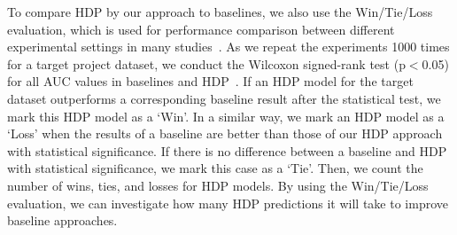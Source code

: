 To compare HDP by our approach to baselines, we also use the
Win/Tie/Loss evaluation, which is used for performance comparison between
different experimental settings in many studies~\cite{Kocaguneli13,Li12,
Valentini03}. As we repeat the experiments 1000 times for a target project
dataset, we
conduct the Wilcoxon signed-rank test (p$<$0.05) for all AUC values in
baselines and HDP~\cite{Wilcoxon45}.
If an HDP model for the target dataset outperforms a corresponding
baseline result after the statistical test, we mark this HDP model as a `Win'.
In a similar way, we mark an HDP model as a `Loss' when the results of
a baseline are better than those of our HDP approach with statistical
significance.
If there is no difference between a baseline and HDP with statistical
significance, we mark this case as a `Tie'. Then, we count the number of
wins, ties, and losses for HDP models. By using the Win/Tie/Loss
evaluation, we can investigate how many HDP predictions it will take to improve
baseline approaches.


